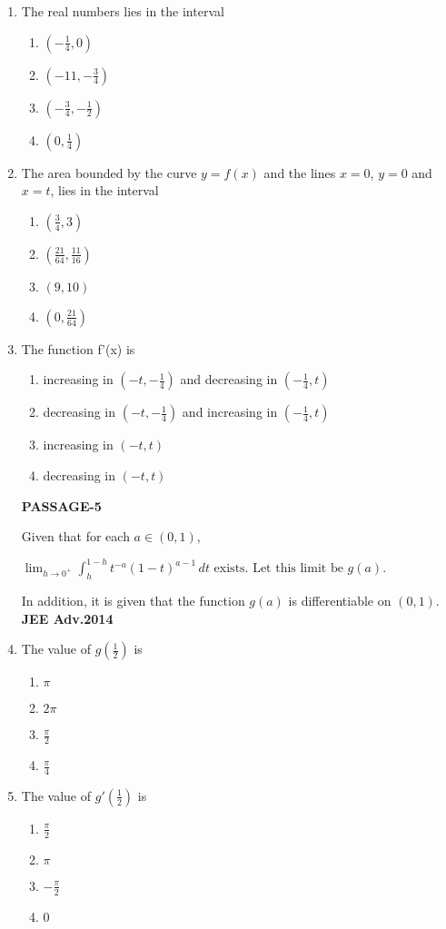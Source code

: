 \documentclass[journal,12pt,twocolumn]{IEEEtran}
\theoremstyle{remark}
\begin{document}
\begin{enumerate}
\item The real numbers lies in the interval
\begin{enumerate}
    \item $(-\frac{1}{4},0)$
    \item $(-11,-\frac{3}{4})$
    \item $(-\frac{3}{4},-\frac{1}{2})$
     \item $(0,\frac{1}{4})$
\end{enumerate}
\item The area bounded by the curve $y=f(x)$ and the lines $x=0$, $y=0$ 
 and $x=t$, lies in the interval
\begin{enumerate}
\item $(\frac{3}{4},3)$ 
\item $(\frac{21}{64},\frac{11}{16})$ 
\item $(9,10)$  
\item $(0,\frac{21}{64})$ 
\end{enumerate}
\item The function f'(x) is
\begin{enumerate}
    \item increasing in $(-t,-\frac{1}{4})$ and decreasing in $(-\frac{1}{4},t)$ 
    \item decreasing in $(-t,-\frac{1}{4})$ and increasing in $(-\frac{1}{4},t)$ 
    \item increasing in $(-t,t)$ 
    \item decreasing in $(-t,t)$
\end{enumerate}
\textbf{PASSAGE-5}

Given that for each $a \in (0, 1)$,

$\lim_{h \to 0^+} \int_h^{1-h} t^{-a} (1-t)^{a-1} \, dt \text{ exists. Let this limit be } g(a).$

In addition, it is given that the function \(g(a)\) is differentiable on $(0, 1)$. 
\hfill\textbf{JEE Adv.2014} 
    \item The value of $g(\frac{1}{2})$ is
    \begin{enumerate}
        \item $\pi$
        \item $2\pi$
        \item $\frac{\pi}{2}$
        \item $\frac{\pi}{4}$
    \end{enumerate}
    \item The value of $g'(\frac{1}{2})$ is
    \begin{enumerate}
        \item$\frac{\pi}{2}$
        \item${\pi} $
        \item $-\frac{\pi}{2}$
        \item 0
\end{enumerate}
\end{enumerate}
\end{document}
